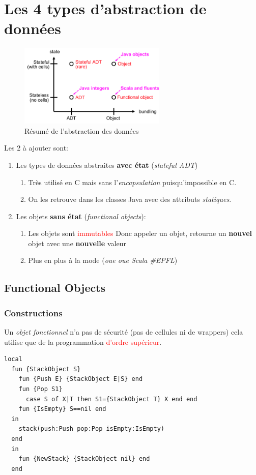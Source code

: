 \documentclass{report}
\begin{document}
\section{Les 4 types d'abstraction de données}
\begin{figure}
\centering
\includegraphics[width=7cm]{img/resAbstract.png}
\caption{Résumé de l'abstraction des données}
\end{figure}
Les 2 à ajouter sont:
\begin{enumerate}
\item Les types de données abstraites \textbf{avec état} (\textit{stateful ADT})
	\begin{enumerate}
	\item Très utilisé en C mais sans l'\textit{encapsulation} puisqu'impossible en C.
	\item On les retrouve dans les classes Java avec des attributs \textit{statiques}.
	\end{enumerate}
\item Les objets \textbf{sans état} (\textit{functional objects}):
	\begin{enumerate}
	\item Les objets sont \textcolor{red}{immutables} Donc appeler un objet, retourne un \textbf{nouvel} objet avec une \textbf{nouvelle} valeur
	\item Plus en plus à la mode (\textit{oue oue Scala \#EPFL})
	\end{enumerate}
\end{enumerate}

\subsection{Functional Objects}
\subsubsection{Constructions}
Un \textit{objet fonctionnel} n'a pas de sécurité (pas de cellules ni de wrappers) cela utilise que de la programmation \textcolor{red}{d'ordre supérieur}.
\begin{lstlisting}[escapechar=\%]
local 
  fun {StackObject S} 
    fun {Push E} {StackObject E|S} end 
    fun {Pop S1} 
      case S of X|T then S1={StackObject T} X end end 
    fun {IsEmpty} S==nil end
  in
    stack(push:Push pop:Pop isEmpty:IsEmpty) 
  end 
  in 
    fun {NewStack} {StackObject nil} end
  end
\end{lstlisting}
\end{document}
